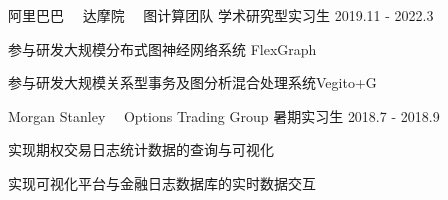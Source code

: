 


\begin{cventries}


\cventry
{} %
{阿里巴巴 \ \textbullet\  达摩院 \ \textbullet\ 图计算团队} %
{学术研究型实习生} %
{2019.11 - 2022.3} %
{ %
\vspace{-3mm}
    \begin{cvitems}
        \item {参与研发大规模分布式图神经网络系统 FlexGraph}
        \item {参与研发大规模关系型事务及图分析混合处理系统Vegito+G}
    \end{cvitems}
}

\vspace{-3mm}

\cventry
{} %
{Morgan Stanley \ \textbullet\  Options Trading Group} %
{暑期实习生} %
{2018.7 - 2018.9} %
{ %
\vspace{-3mm}
	\begin{cvitems}
		\item {实现期权交易日志统计数据的查询与可视化}
        \item {实现可视化平台与金融日志数据库的实时数据交互}
	\end{cvitems}
}


\end{cventries}
